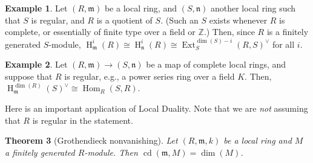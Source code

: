 \documentclass[11pt]{book}
\newtheorem{theorem}{Theorem}[chapter]
\numberwithin{equation}{section}
\numberwithin{theorem}{chapter}
\theoremstyle{definition}
\newtheorem{example}[theorem]{Example}
\newtheorem*{basic properties}{Basic Properties}
\newtheorem*{Important Remark}{Important Remark}
\theoremstyle{remark}
\newcommand{\ZZ}{\mathbb{Z}}
\newcommand{\m}{\mathfrak{m}}
\newcommand{\n}{\mathfrak{n}}
\newcommand{\Hom}{\operatorname{Hom}}
\newcommand{\Ext}{\operatorname{Ext}}
\DeclareMathOperator{\cd}{cd}
\renewcommand{\dim}{\operatorname{dim}}
\renewcommand{\H}{\operatorname{H}}
\begin{document}
\begin{example}
	Let $(R,\m)$ be a local ring, and $(S,\n)$ another local ring such that $S$ is regular, and $R$ is a quotient of $S$. (Such an $S$ exists whenever $R$ is complete, or essentially of finite type over a field or $\ZZ$.) Then, since $R$ is a finitely generated $S$-module, $\H^i_\m(R)\cong \H^i_\n(R) \cong \Ext^{\dim(S)-i}_S(R,S)^\vee$ for all $i$.
\end{example}

\begin{example}
	Let $(R,\m)\to (S,\n)$ be a map of complete local rings, and suppose that $R$ is regular, e.g., a power series ring over a field $K$. Then, $\H^{\dim(R)}_{\m}(S)^{\vee}\cong  \Hom_R(S,R)$.
\end{example}

Here is an important application of Local Duality. Note that we are \emph{not} assuming that $R$ is regular in the statement.

\begin{theorem}[Grothendieck nonvanishing]
	Let $(R,\m,k)$ be a local ring and $M$ a finitely generated $R$-module. Then $\cd(\m,M) = \dim(M)$.
\end{theorem}
\end{document}
